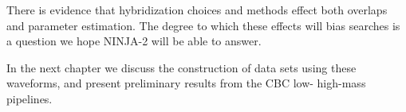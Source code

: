 There is evidence that hybridization choices and methods effect both
overlaps and parameter estimation.   The degree to which these effects
will bias searches is a question we hope NINJA-2 will be able to
answer.

In the next chapter we discuss the construction of data sets using
these waveforms, and present preliminary results from the CBC low-
high-mass pipelines.


\clearpage

